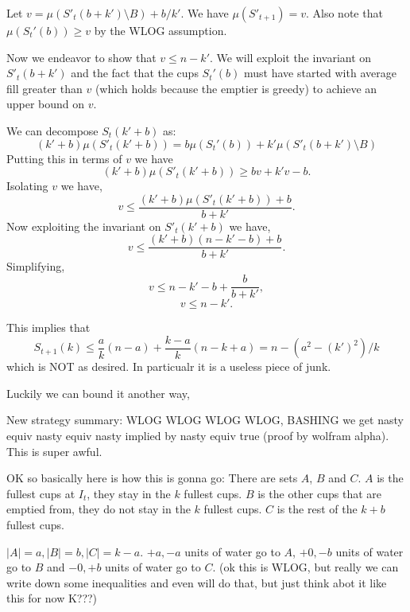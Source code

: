 \documentclass[twocolumn]{article}[11pt]
\begin{document}
  Let $v = \mu(S'_t(b+k')\setminus B) + b/k'$. We have $\mu(S'_{t+1}) = v$. 
  Also note that $\mu(S_t'(b)) \ge v$ by the WLOG assumption.

  Now we endeavor to show that $v \le n-k'$. We will exploit the invariant on
  $S'_t(b+k')$ and the fact that the cups $S_t'(b)$ must have started with
  average fill greater than $v$ (which holds because the emptier is greedy)
  to achieve an upper bound on $v$.

  We can decompose $S_t(k'+b)$ as:
  $$(k' + b)\mu(S'_t(k'+b)) = b\mu(S_t'(b)) + k'\mu(S'_t(b+k')\setminus B)$$
  Putting this in terms of $v$ we have
  $$(k' + b)\mu(S'_t(k'+b)) \ge bv + k'v - b.$$
  Isolating $v$ we have,
  $$v \le \frac{(k' + b)\mu(S'_t(k'+b)) + b}{b+k'}.$$
  Now exploiting the invariant on $S'_t(k'+b)$ we have,
  $$v \le \frac{(k' + b)(n-k'-b) + b}{b+k'}.$$
  Simplifying, 
  $$v \le n-k'-b + \frac{b}{b+k'},$$
  $$v \le n-k'.$$

  This implies that 
  $$S_{t+1}(k) \le \frac{a}{k} (n-a) + \frac{k-a}{k}(n-k+a) = n - (a^2 - (k')^2)/k$$
  which is NOT as desired. In particualr it is a useless piece of junk.

  Luckily we can bound it another way,

  New strategy summary: WLOG WLOG WLOG WLOG, BASHING we get nasty equiv nasty
  equiv nasty implied by nasty equiv true (proof by wolfram alpha). This is
  super awful.

OK so basically here is how this is gonna go:
There are sets $A$, $B$ and $C$. $A$ is the fullest cups at $I_t$, they stay in
the $k$ fullest cups. $B$ is the other cups that are emptied from, they do not
stay in the $k$ fullest cups. $C$ is the rest of the $k+b$ fullest cups.

$|A| =a, |B|=b, |C| = k-a$.
$+a,-a$ units of water go to $A$, $+0,-b$ units of water go to $B$ and $-0, +b$ units of water go to $C$.
(ok this is WLOG, but really we can write down some inequalities and even will do that, but just think abot it like this for now K???) 
\end{document}
